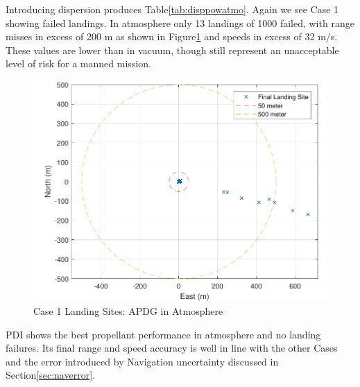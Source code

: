 Introducing dispersion produces Table\:\ref{tab:disppowatmo}. Again we see Case 1 showing failed landings. In atmosphere only 13 landings of 1000 failed, with range misses in excess of 200 m as shown in Figure\:\ref{fig:bulldisppowatmo} and speeds in excess of 32 m/s. These values are lower than in vacuum, though still represent an unacceptable level of risk for a manned mission.

\begin{figure}[H]
	\centering
	\begin{minipage}{4.3 in}
		\includegraphics[width=\linewidth]{Figures/bulldisppowatmo.pdf}
		\caption{Case 1 Landing Sites: APDG in Atmosphere \label{fig:bulldisppowatmo} }
	\end{minipage}
\end{figure}

PDI shows the best propellant performance in atmosphere and no landing failures. Its final range and speed accuracy is well in line with the other Cases and the error introduced by Navigation uncertainty discussed in Section\:\ref{sec:naverror}.

